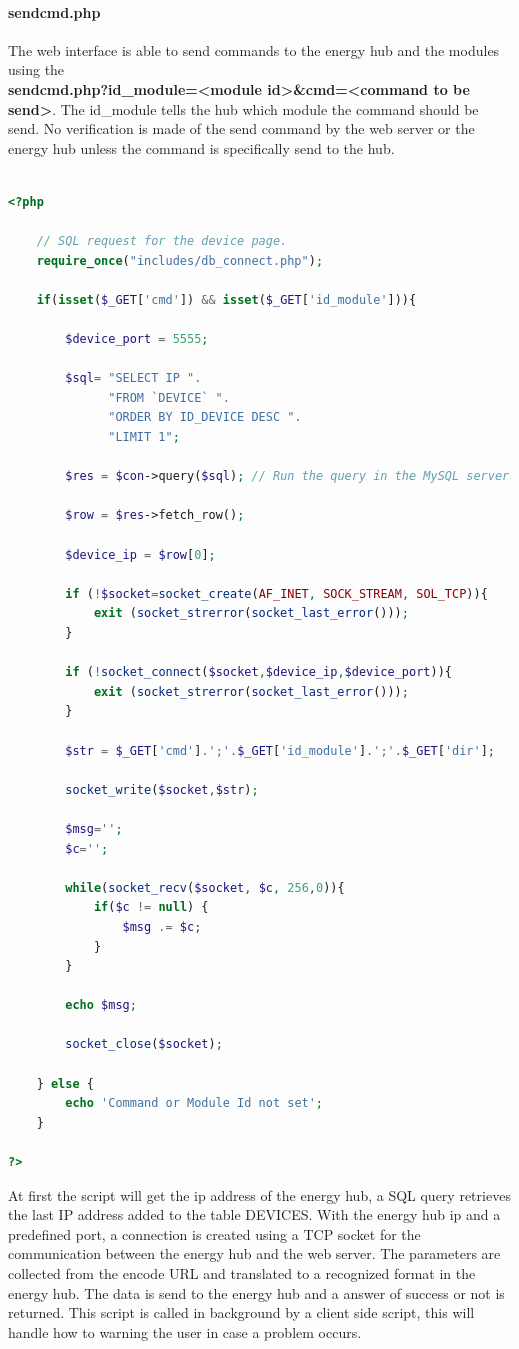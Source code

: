 \paragraph{sendcmd.php}

The web interface is able to send commands to the energy hub and the modules using the\\ \textbf{sendcmd.php?id\_module=\textless module id\textgreater\&cmd=\textless command to be send\textgreater }. The id\_module tells the hub which module the command should be send.
No verification is made of the send command by the web server or the energy hub unless the command is specifically send to the hub.

\begin{lstlisting}[language=php]

<?php
	
	// SQL request for the device page.
	require_once("includes/db_connect.php");
	
	if(isset($_GET['cmd']) && isset($_GET['id_module'])){
		
		$device_port = 5555;
			
		$sql= "SELECT IP ". 
			  "FROM `DEVICE` ". 
			  "ORDER BY ID_DEVICE DESC ".
			  "LIMIT 1";
		
		$res = $con->query($sql); // Run the query in the MySQL server
		
		$row = $res->fetch_row();
		
		$device_ip = $row[0];
		
		if (!$socket=socket_create(AF_INET, SOCK_STREAM, SOL_TCP)){
			exit (socket_strerror(socket_last_error()));
		}
	
		if (!socket_connect($socket,$device_ip,$device_port)){
			exit (socket_strerror(socket_last_error()));
		}
	
		$str = $_GET['cmd'].';'.$_GET['id_module'].';'.$_GET['dir'];
		
		socket_write($socket,$str);
	
		$msg='';
		$c='';
    	
		while(socket_recv($socket, $c, 256,0)){
  			if($c != null) {
   				$msg .= $c;
			}
		}
		
		echo $msg;
        
		socket_close($socket);
		
	} else {
		echo 'Command or Module Id not set';
	}

?>
\end{lstlisting}

At first the script will get the ip address of the energy hub, a SQL query retrieves the last IP address added to the table DEVICES. With the energy hub ip and a predefined port, a connection is created using a TCP socket for the communication between the energy hub and the web server. The parameters are collected from the encode URL and translated to a recognized format in the energy hub. The data is send to the energy hub and a answer of success or not is returned.
\p
This script is called in background by a client side script, this will handle how to warning the user in case a problem occurs.

